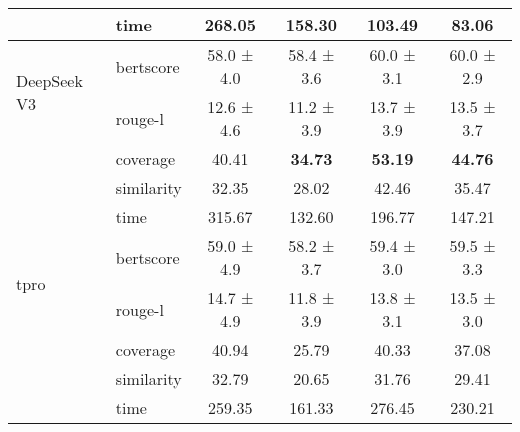 \documentclass{article}
\theoremstyle{definition}
\theoremstyle{plain}
\begin{document}
\begin{table}[ht]
\begin{tabular}{llcccc}
 & time & 268.05 & 158.30 & 103.49 & 83.06 \\
\midrule
\multirow{2}{*}{DeepSeek V3}
 & bertscore & 58.0 ± 4.0 & 58.4 ± 3.6 & 60.0 ± 3.1 & 60.0 ± 2.9 \\
 & rouge-l & 12.6 ± 4.6 & 11.2 ± 3.9 & 13.7 ± 3.9 & 13.5 ± 3.7 \\
 & coverage & 40.41 & \textbf{34.73} & \textbf{53.19} & \textbf{44.76}\\
 & similarity & 32.35 & 28.02 & 42.46 & 35.47\\
 & time & 315.67 & 132.60 & 196.77 & 147.21 \\
\midrule
\multirow{2}{*}{tpro}
 & bertscore & 59.0 ± 4.9 & 58.2 ± 3.7 & 59.4 ± 3.0 & 59.5 ± 3.3 \\
 & rouge-l & 14.7 ± 4.9 & 11.8 ± 3.9 & 13.8 ± 3.1 & 13.5 ± 3.0 \\
 & coverage & 40.94 & 25.79 & 40.33 & 37.08 \\
 & similarity & 32.79 & 20.65 & 31.76 & 29.41 \\
 & time & 259.35 & 161.33 & 276.45 & 230.21 \\ 
\bottomrule
\end{tabular}
\end{table}
\end{document}
